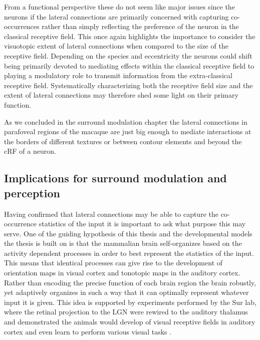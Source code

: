 From a functional perspective these do not seem like major issues
since the neurons if the lateral connections are primarily concerned
with capturing co-occurrences rather than simply reflecting the
preference of the neuron in the classical receptive field. This once
again highlights the importance to consider the visuotopic extent of
lateral connections when compared to the size of the receptive
field. Depending on the species and eccentricity the neurons could
shift being primarily devoted to mediating effects within the
classical receptive field to playing a modulatory role to transmit
information from the extra-classical receptive field. Systematically
characterizing both the receptive field size and the extent of lateral
connections may therefore shed some light on their primary function.

As we concluded in the surround modulation chapter the lateral
connections in parafoveal regions of the macaque are just big enough
to mediate interactions at the borders of different textures or
between contour elements and beyond the cRF of a neuron.

\subsection{Implications for surround modulation and perception}

Having confirmed that lateral connections may be able to capture the
co-occurrence statistics of the input it is important to ask what
purpose this may serve. One of the guiding hypothesis of this thesis
and the developmental models the thesis is built on is that the
mammalian brain self-organizes based on the activity dependent
processes in order to best represent the statistics of the input. This
means that identical processes can give rise to the development of
orientation maps in visual cortex and tonotopic maps in the auditory
cortex. Rather than encoding the precise function of each brain region
the brain robustly, yet adaptively organizes in such a way that it can
optimally represent whatever input it is given. This idea is supported
by experiments performed by the Sur lab, where the retinal projection
to the LGN were rewired to the auditory thalamus and demonstrated the
animals would develop of visual receptive fields in auditory cortex
and even learn to perform various visual tasks
\citep{vonMelchner2000}.

